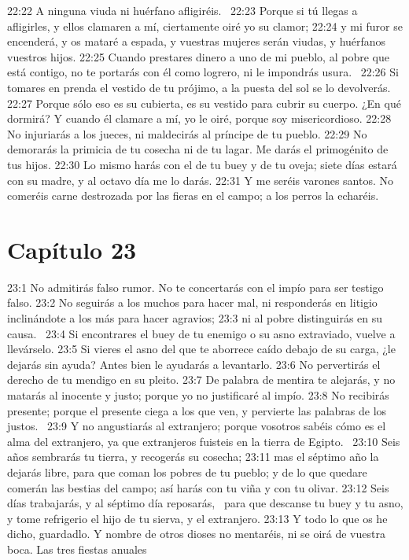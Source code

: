 22:22 A ninguna viuda ni huérfano afligiréis.  
22:23 Porque si tú llegas a afligirles, y ellos clamaren a mí, ciertamente oiré yo su clamor; 
22:24 y mi furor se encenderá, y os mataré a espada, y vuestras mujeres serán viudas, y huérfanos vuestros hijos. 
22:25 Cuando prestares dinero a uno de mi pueblo, al pobre que está contigo, no te portarás con él como logrero, ni le impondrás usura.  
22:26 Si tomares en prenda el vestido de tu prójimo, a la puesta del sol se lo devolverás. 
22:27 Porque sólo eso es su cubierta, es su vestido para cubrir su cuerpo. ¿En qué dormirá? Y cuando él clamare a mí, yo le oiré, porque soy misericordioso. 
22:28 No injuriarás a los jueces, ni maldecirás al príncipe de tu pueblo. 
22:29 No demorarás la primicia de tu cosecha ni de tu lagar. Me darás el primogénito de tus hijos. 
22:30 Lo mismo harás con el de tu buey y de tu oveja; siete días estará con su madre, y al octavo día me lo darás. 
22:31 Y me seréis varones santos. No comeréis carne destrozada por las fieras en el campo; a los perros la echaréis. 
\section*{Capítulo 23}

23:1 No admitirás falso rumor. No te concertarás con el impío para ser testigo falso. 
23:2 No seguirás a los muchos para hacer mal, ni responderás en litigio inclinándote a los más para hacer agravios; 
23:3 ni al pobre distinguirás en su causa.  
23:4 Si encontrares el buey de tu enemigo o su asno extraviado, vuelve a llevárselo. 
23:5 Si vieres el asno del que te aborrece caído debajo de su carga, ¿le dejarás sin ayuda? Antes bien le ayudarás a levantarlo. 
23:6 No pervertirás el derecho de tu mendigo en su pleito. 
23:7 De palabra de mentira te alejarás, y no matarás al inocente y justo; porque yo no justificaré al impío. 
23:8 No recibirás presente; porque el presente ciega a los que ven, y pervierte las palabras de los justos.  
23:9 Y no angustiarás al extranjero; porque vosotros sabéis cómo es el alma del extranjero, ya que extranjeros fuisteis en la tierra de Egipto.  
23:10 Seis años sembrarás tu tierra, y recogerás su cosecha; 
23:11 mas el séptimo año la dejarás libre, para que coman los pobres de tu pueblo; y de lo que quedare comerán las bestias del campo; así harás con tu viña y con tu olivar. 
23:12 Seis días trabajarás, y al séptimo día reposarás,  para que descanse tu buey y tu asno, y tome refrigerio el hijo de tu sierva, y el extranjero. 
23:13 Y todo lo que os he dicho, guardadlo. Y nombre de otros dioses no mentaréis, ni se oirá de vuestra boca. 
Las tres fiestas anuales 

